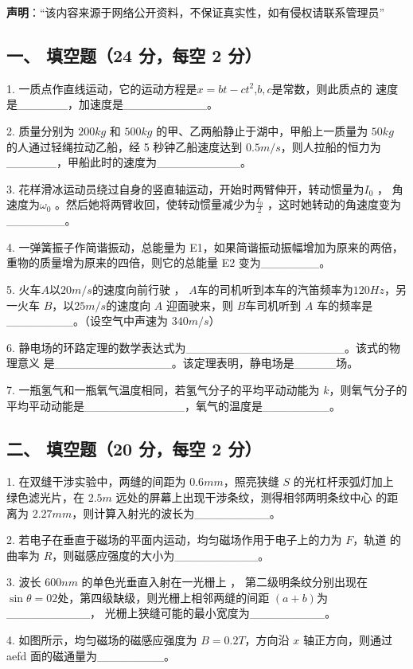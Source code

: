 
\textbf{声明}：“该内容来源于网络公开资料，不保证真实性，如有侵权请联系管理员”

\subsection{一、 填空题（24 分，每空 2 分）}
1. 一质点作直线运动，它的运动方程是$x=bt-ct^2$,$b,c$是常数，则此质点的
速度是______，加速度是__________。

2. 质量分别为 $200kg$ 和 $500kg$ 的甲、乙两船静止于湖中，甲船上一质量为 $50kg$
的人通过轻绳拉动乙船，经 5 秒钟乙船速度达到 $0.5m/s$，则人拉船的恒力为
______，甲船此时的速度为__________。

3. 花样滑冰运动员绕过自身的竖直轴运动，开始时两臂伸开，转动惯量为$I_0$ ，
角速度为$\omega_0$ 。然后她将两臂收回，使转动惯量减少为$\frac{I_0}{2}$ ，这时她转动的角速度变为_______。

4. 一弹簧振子作简谐振动，总能量为 E1，如果简谐振动振幅增加为原来的两倍，
重物的质量增为原来的四倍，则它的总能量 E2 变为_______。

5. 火车$A$以$20m/s$的速度向前行驶 ， $A$车的司机听到本车的汽笛频率为$120Hz$，另一火车 $B$，以$25m/s$的速度向 $A$ 迎面驶来，则 $B$车司机听到 $A$ 车的频率是 ________。（设空气中声速为 3$40m/s$）

6. 静电场的环路定理的数学表达式为___________________。该式的物理意义
是______________。该定理表明，静电场是_____场。

7. 一瓶氢气和一瓶氧气温度相同，若氢气分子的平均平动动能为 $k$，则氧气分子的平均平动动能是____________，氧气的温度是________。
\subsection{二、 填空题（20 分，每空 2 分）}
1. 在双缝干涉实验中，两缝的间距为 $0.6mm$，照亮狭缝 $S$ 的光杠杆汞弧灯加上
绿色滤光片，在 $2.5m$ 远处的屏幕上出现干涉条纹，测得相邻两明条纹中心
的距离为 $2.27mm$，则计算入射光的波长为_________。

2. 若电子在垂直于磁场的平面内运动，均匀磁场作用于电子上的力为 $F$，轨道
的曲率为 $R$，则磁感应强度的大小为__________。

3. 波长 $600nm$ 的单色光垂直入射在一光栅上 ， 第二级明条纹分别出现在$\sin\theta=02$处，第四级缺级，则光栅上相邻两缝的间距 $(a+b)$为__________，
光栅上狭缝可能的最小宽度为_________。

4. 如图所示，均匀磁场的磁感应强度为 $B=0.2T$，方向沿 $x$ 轴正方向，则通过
aefd 面的磁通量为________。

